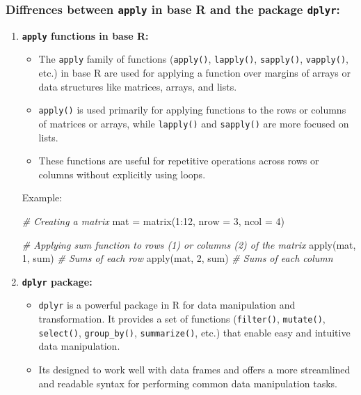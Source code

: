 \documentclass[
]{article}
\newenvironment{Shaded}{}{}
\newcommand{\AttributeTok}[1]{\textcolor[rgb]{0.49,0.56,0.16}{#1}}
\newcommand{\CommentTok}[1]{\textcolor[rgb]{0.38,0.63,0.69}{\textit{#1}}}
\newcommand{\DecValTok}[1]{\textcolor[rgb]{0.25,0.63,0.44}{#1}}
\newcommand{\FunctionTok}[1]{\textcolor[rgb]{0.02,0.16,0.49}{#1}}
\newcommand{\NormalTok}[1]{#1}
\newcommand{\OtherTok}[1]{\textcolor[rgb]{0.00,0.44,0.13}{#1}}
\newcommand{\SpecialCharTok}[1]{\textcolor[rgb]{0.25,0.44,0.63}{#1}}
\begin{document}
\hypertarget{diffrences-between-apply-in-base-r-and-the-package-dplyr}{%
\subsubsection{\texorpdfstring{Diffrences between \texttt{apply} in base
R and the package
\texttt{dplyr}:}{Diffrences between apply in base R and the package dplyr:}}\label{diffrences-between-apply-in-base-r-and-the-package-dplyr}}

\begin{enumerate}
\def\labelenumi{\arabic{enumi}.}
\item
  \textbf{\texttt{apply} functions in base R:}

  \begin{itemize}
  \item
    The \texttt{apply} family of functions (\texttt{apply()},
    \texttt{lapply()}, \texttt{sapply()}, \texttt{vapply()}, etc.) in
    base R are used for applying a function over margins of arrays or
    data structures like matrices, arrays, and lists.
  \item
    \texttt{apply()} is used primarily for applying functions to the
    rows or columns of matrices or arrays, while \texttt{lapply()} and
    \texttt{sapply()} are more focused on lists.
  \item
    These functions are useful for repetitive operations across rows or
    columns without explicitly using loops.
  \end{itemize}

  Example:

\begin{Shaded}
\begin{Highlighting}[]
 \CommentTok{\# Creating a matrix}
\NormalTok{ mat }\OtherTok{=} \FunctionTok{matrix}\NormalTok{(}\DecValTok{1}\SpecialCharTok{:}\DecValTok{12}\NormalTok{, }\AttributeTok{nrow =} \DecValTok{3}\NormalTok{, }\AttributeTok{ncol =} \DecValTok{4}\NormalTok{)}

 \CommentTok{\# Applying sum function to rows (1) or columns (2) of the matrix}
 \FunctionTok{apply}\NormalTok{(mat, }\DecValTok{1}\NormalTok{, sum)  }\CommentTok{\# Sums of each row}
 \FunctionTok{apply}\NormalTok{(mat, }\DecValTok{2}\NormalTok{, sum)  }\CommentTok{\# Sums of each column}
\end{Highlighting}
\end{Shaded}
\item
  \textbf{\texttt{dplyr} package:}

  \begin{itemize}
  \item
    \texttt{dplyr} is a powerful package in R for data manipulation and
    transformation. It provides a set of functions (\texttt{filter()},
    \texttt{mutate()}, \texttt{select()}, \texttt{group\_by()},
    \texttt{summarize()}, etc.) that enable easy and intuitive data
    manipulation.
  \item
    It\textquotesingle s designed to work well with data frames and
    offers a more streamlined and readable syntax for performing common
    data manipulation tasks.
  \end{itemize}


\end{enumerate}
\end{document}
